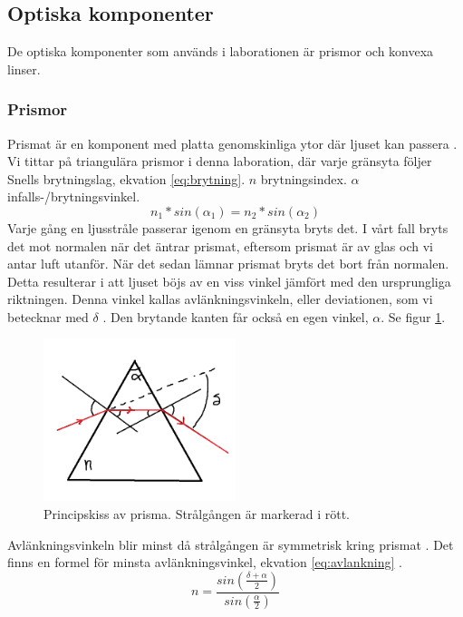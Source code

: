 \documentclass[a4paper]{article}
\begin{document}
\subsection{Optiska komponenter}
De optiska komponenter som används i laborationen är prismor och konvexa linser.
\subsubsection{Prismor}
Prismat är en komponent med platta genomskinliga ytor där ljuset kan passera . Vi tittar på triangulära prismor i denna laboration,
där varje gränsyta följer Snells brytningslag, ekvation \ref{eq:brytning}\cite[p.202]{vl}. $n$ brytningsindex. $\alpha$ infalls-/brytningsvinkel.
\begin{equation}
    n_1*sin(\alpha_1) = n_2*sin(\alpha_2)
    \label{eq:brytning}
\end{equation}
Varje gång en ljusstråle passerar igenom en gränsyta bryts det. I vårt fall bryts det mot normalen när det äntrar prismat, eftersom prismat är av glas och vi antar luft utanför.
När det sedan lämnar prismat bryts det bort från normalen. Detta resulterar i att ljuset böjs av en viss vinkel jämfört med den ursprungliga riktningen. Denna vinkel kallas
avlänkningsvinkeln, eller deviationen, som vi betecknar med $\delta$ . Den brytande kanten får också en egen vinkel, $\alpha$. Se figur \ref{fig:prism}.
\begin{figure}[h!]
    \centering
    \includegraphics[width=0.5\textwidth]{prism.png}
    \caption{Principskiss av prisma. Strålgången är markerad i rött.}
    \label{fig:prism}
\end{figure}
Avlänkningsvinkeln blir minst då strålgången är symmetrisk kring prismat \cite[p.210-211]{vl}. Det finns en formel för minsta avlänkningsvinkel, ekvation \ref{eq:avlankning} \cite[p.212]{vl}.
\begin{equation}
    n = \frac{sin(\frac{\delta +\alpha}{2})}{sin(\frac{\alpha}{2})}
    \label{eq:avlankning}
\end{equation}
\end{document}

